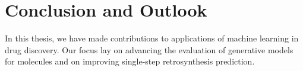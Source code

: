 \chapter{Conclusion and Outlook\label{chap:conclusion}}
In this thesis, we have made contributions to applications of machine learning in
drug discovery. Our focus lay on advancing the evaluation of generative models for
molecules and on improving single-step retrosynthesis prediction.

